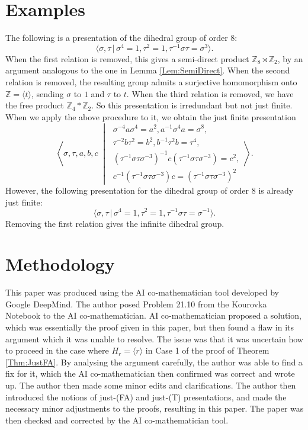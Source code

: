 \documentclass[11pt,oneside]{amsart}
\begin{document}
\section{Examples}
\label{Sec:Examples}
The following is a presentation of the dihedral group of order 8:
$$\langle \sigma, \tau \, | \, \sigma^4 = 1, \tau^2 = 1, \tau^{-1} \sigma \tau = \sigma^3 \rangle.$$
When the first relation is removed, this gives a semi-direct product $\mathbb{Z}_{8} \rtimes \mathbb{Z}_2$, by an argument analogous to the one in Lemma \ref{Lem:SemiDirect}. When the second relation is removed, the resulting group admits a surjective homomorphism onto $\mathbb{Z} = \langle t \rangle$, sending $\sigma$ to $1$ and $\tau$ to $t$. When the third relation is removed, we have the free product $\mathbb{Z}_4 \ast \mathbb{Z}_2$. So this presentation is irredundant but not just finite. When we apply the above procedure to it, we obtain the just finite presentation
$$\left \langle \sigma, \tau, a, b, c \;\middle|\;
\begin{array}{c} \sigma^{-4} a \sigma^4 = a^2 , a^{-1} \sigma^4 a = \sigma^8, \\
\tau^{-2} b \tau^2 = b^2 , b^{-1} \tau^2 b = \tau^4, \\
(\tau^{-1} \sigma \tau \sigma^{-3})^{-1} c (\tau^{-1} \sigma \tau \sigma^{-3}) = c^2,\\
c^{-1} (\tau^{-1} \sigma \tau \sigma^{-3}) c= (\tau^{-1} \sigma \tau \sigma^{-3})^2 
\end{array}
\right \rangle.$$
However, the following presentation for the dihedral group of order 8 is already just finite:
$$\langle \sigma, \tau \, | \, \sigma^4 = 1, \tau^2 = 1, \tau^{-1} \sigma \tau = \sigma^{-1} \rangle.$$
Removing the first relation gives the infinite dihedral group.

\section{Methodology}
This paper was produced using the AI co-mathematician tool \cite{Zheng} developed by Google DeepMind. The author posed Problem 21.10 from the Kourovka Notebook to the AI co-mathematician. AI co-mathematician proposed a solution, which was essentially the proof given in this paper, but then found a flaw in its argument which it was unable to resolve. The issue was that it was uncertain how to proceed in the case where $H_r = \langle r \rangle$  in Case 1 of the proof of Theorem \ref{Thm:JustFA}. By analysing the argument carefully, the author was able to find a fix for it, which the AI co-mathematician then confirmed was correct and wrote up. The author then made some minor edits and clarifications. The author then introduced the notions of just-(FA) and just-(T) presentations, and made the necessary minor adjustments to the proofs, resulting in this paper. The paper was then checked and corrected by the AI co-mathematician tool.



\end{document}

